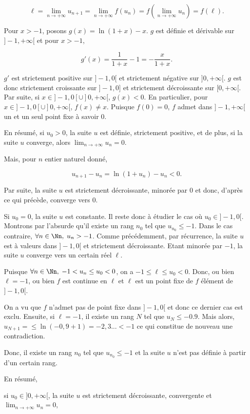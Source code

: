 {{$$\ell=\lim_{n\rightarrow +\infty}u_{n+1}=\lim_{n\rightarrow +\infty}f(u_n)=f(\lim_{n\rightarrow +\infty}u_n)=f(\ell).$$

Pour $x>-1$, posons $g(x)=\ln(1+x)-x$. $g$ est définie et dérivable sur $]-1,+\infty[$ et pour $x>-1$,

$$g'(x)=\frac{1}{1+x}-1=-\frac{x}{1+x}.$$

$g'$ est strictement positive sur $]-1,0[$ et strictement négative sur $]0,+\infty[$. $g$ est donc strictement croissante sur $]-1,0]$ et strictement décroissante sur $[0,+\infty[$. Par suite, si $x\in]-1,0[\cup]0,+\infty[$, $g(x)<0$. En particulier, pour $x\in]-1,0[\cup]0,+\infty[$, $f(x)\neq x$. Puisque $f(0)=0$, $f$ admet dans $]-1,+\infty[$ un et un seul point fixe à savoir $0$.

En résumé, si $u_0>0$, la suite $u$ est définie, strictement positive, et de plus, si la suite $u$ converge, alors $\lim_{n\rightarrow +\infty}u_n=0$.

Mais, pour $n$ entier naturel donné,

$$u_{n+1}-u_n=\ln(1+u_n)-u_n<0.$$

Par suite, la suite $u$ est strictement décroissante, minorée par $0$ et donc, d'après ce qui précède, converge vers $0$.

Si $u_0=0$, la suite $u$ est constante. Il reste donc à étudier le cas où $u_0\in]-1,0[$. Montrons par l'absurde qu'il existe un rang $n_0$ tel que $u_{n_0}\leq-1$. Dans le cas contraire, $\forall n\in\Nn,\;u_n>-1$. Comme précédemment, par récurrence, la suite $u$ est à valeurs dans $]-1,0[$ et strictement décroissante. Etant minorée par $-1$, la suite $u$ converge vers un certain réel $\ell$.

Puisque $\forall n\in\Nn,\;-1<u_n\leq u_0<0$, on a $-1\leq\ell\leq u_0<0$. Donc, ou bien $\ell=-1$, ou bien $f$ est continue en $\ell$ et $\ell$ est un point fixe de $f$ élément de $]-1,0[$.

On a vu que $f$ n'admet pas de point fixe dans $]-1,0[$ et donc ce dernier cas est exclu. Ensuite, si $\ell=-1$, il existe un rang $N$ tel que $u_N\leq -0.9$. Mais alors, $u_{N+1}=\leq\ln(-0,9+1)=-2,3...<-1$ ce qui constitue de nouveau une contradiction.

Donc, il existe un rang $n_0$ tel que $u_{n_0}\leq-1$ et la suite $u$ n'est pas définie à partir d'un certain rang.

En résumé,

si $u_0\in]0,+\infty[$, la suite $u$ est strictement décroissante, convergente et $\lim_{n\rightarrow +\infty}u_n=0$,

}}
